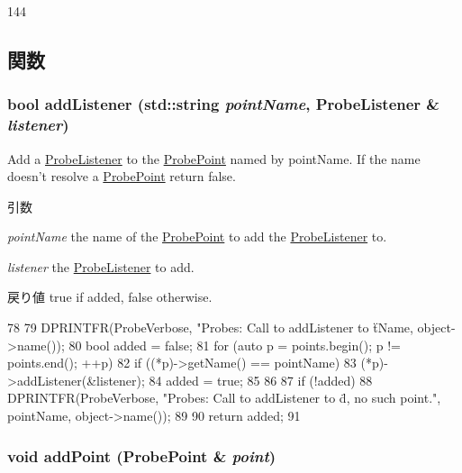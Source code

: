\begin{DoxyCode}
144 {}
\end{DoxyCode}


\subsection{関数}
\hypertarget{classProbeManager_a3d7e44846a13cad7b35eb12c48bd0d4a}{
\subsubsection[{addListener}]{\setlength{\rightskip}{0pt plus 5cm}bool addListener (std::string {\em pointName}, \/  {\bf ProbeListener} \& {\em listener})}}
\label{classProbeManager_a3d7e44846a13cad7b35eb12c48bd0d4a}


Add a \hyperlink{classProbeListener}{ProbeListener} to the \hyperlink{classProbePoint}{ProbePoint} named by pointName. If the name doesn't resolve a \hyperlink{classProbePoint}{ProbePoint} return false. 
\begin{DoxyParams}{引数}
\item[{\em pointName}]the name of the \hyperlink{classProbePoint}{ProbePoint} to add the \hyperlink{classProbeListener}{ProbeListener} to. \item[{\em listener}]the \hyperlink{classProbeListener}{ProbeListener} to add. \end{DoxyParams}
\begin{DoxyReturn}{戻り値}
true if added, false otherwise. 
\end{DoxyReturn}



\begin{DoxyCode}
78 {
79     DPRINTFR(ProbeVerbose, "Probes: Call to addListener to \"%
      tName, object->name());
80     bool added = false;
81     for (auto p = points.begin(); p != points.end(); ++p) {
82         if ((*p)->getName() == pointName) {
83             (*p)->addListener(&listener);
84             added = true;
85         }
86     }
87     if (!added) {
88         DPRINTFR(ProbeVerbose, "Probes: Call to addListener to \"%
      d, no such point.\n", pointName, object->name());
89     }
90     return added;
91 }
\end{DoxyCode}
\hypertarget{classProbeManager_ad003f80b62472f5f14c0088bac25d218}{
\subsubsection[{addPoint}]{\setlength{\rightskip}{0pt plus 5cm}void addPoint ({\bf ProbePoint} \& {\em point})}}
\label{classProbeManager_ad003f80b62472f5f14c0088bac25d218}


